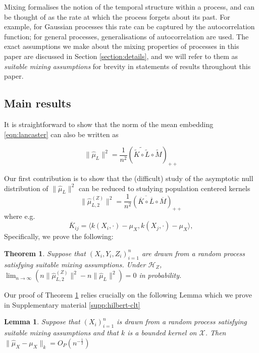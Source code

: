 \documentclass[]{article}
\newtheorem{lemma}{Lemma}
\newtheorem{theorem}{Theorem}
\begin{document}
Mixing formalises the notion of the temporal structure within a process, and can be thought of as the rate at which the process forgets about its past. For example, for Gaussian processes this rate can be captured by the autocorrelation function; for general processes, generalisations of autocorrelation are used. The exact assumptions we make about the mixing properties of processes in this paper are discussed in Section \ref{section:details}, and we will refer to them as \textit{suitable mixing assumptions} for brevity in statements of results throughout this paper.   


\subsection{Main results}

It is straightforward to show that the norm of the mean embedding \eqref{eqn:lancaster} can also be written as

\[ \|\hat \mu_L\|^2 = \frac{1}{n^2}\left(\widetilde{\tilde{K}\circ\tilde{L}}\circ\tilde{M}\right)_{++}\]

Our first contribution is to show that the (difficult) study of the asymptotic null distribution of $ \|\hat \mu_L\|^2$ can be reduced to studying population centered kernels
\[
\| \hat \mu^{(Z)}_{L,2} \|^2 =\frac{1}{n^2}\left(\overline{\overline{K}\circ\overline{L}}\circ\overline{M}\right)_{++}
\]
where e.g. 
\[
\overline{K}_{ij} = \langle k(X_i,\cdot)-\mu_X, k(X_j,\cdot) -\mu_X \rangle,
\]
Specifically, we prove the following:
\begin{theorem}\label{theorem:norm-conv-in-prob} Suppose that $(X_i,Y_i,Z_i)_{i=1}^n$ are drawn from a random process satisfying suitable mixing assumptions. Under $\mathcal{H}_Z$, $\lim_{n \to \infty} ( n\| \hat \mu^{(Z)}_{L,2} \|^2 - n\|\hat \mu_L\|^2 ) =0 $ in probability.
\end{theorem}

Our proof of Theorem \ref{theorem:norm-conv-in-prob} relies crucially on the following Lemma which we prove in Supplementary material \ref{supp:hilbert-clt}
\begin{lemma}\label{lemma:hilbertCLT}
Suppose that $(X_i)_{i=1}^n$ is drawn from a random process satisfying suitable mixing assumptions and that $k$ is a bounded kernel on $\mathcal{X}$. Then $\|\hat\mu_X - \mu_X\|_k = O_P(n^{-\frac{1}{2}})$

\end{lemma}
\end{document}
